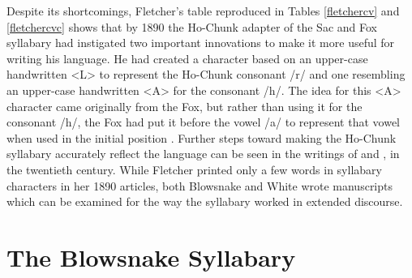 \documentclass[output=paper]{LSP/langsci}
\begin{document}
Despite its shortcomings, Fletcher's table reproduced in Tables \ref{fletchercv} and \ref{fletchercvc} shows that by 1890 the Ho-Chunk adapter of the Sac and Fox syllabary had instigated two important innovations to make it more useful for writing his language. He had created a character based on an upper-case handwritten <L> to represent the Ho-Chunk consonant /r/ and one resembling an upper-case handwritten <A> for the consonant /h/. The idea for this <A> character came originally from the Fox, but rather than using it for the consonant /h/, the Fox had put it before the vowel /a/ to represent that vowel when used in the initial position \citep[170]{Walker1996}. Further steps toward making the Ho-Chunk syllabary accurately reflect the language can be seen in the writings of  and , in the twentieth century. While Fletcher printed only a few words in syllabary characters in her 1890 articles, both Blowsnake and White wrote manuscripts which can be examined for the way the syllabary worked in extended discourse. 

\section{The Blowsnake Syllabary}
\end{document}
